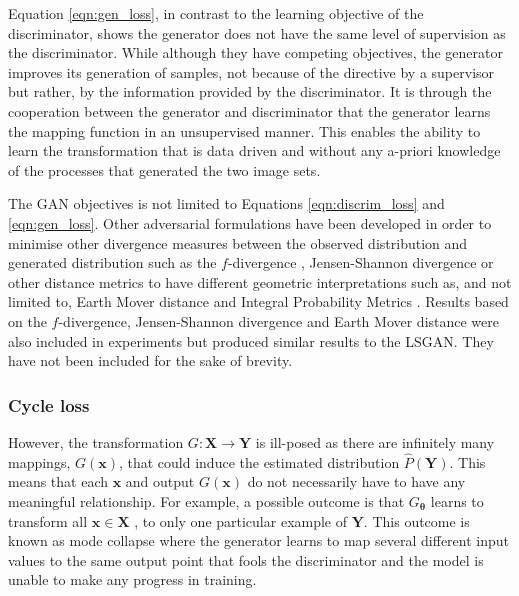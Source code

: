 Equation \ref{eqn:gen_loss}, in contrast to the learning objective of the discriminator, shows the generator does not have the same level of supervision as the discriminator. While although they have competing objectives, the generator improves its generation of samples, not because of the directive by a supervisor but rather, by the information provided by the discriminator. It is through the cooperation between the generator and discriminator that the generator learns the mapping function in an unsupervised manner. This enables the ability to learn the transformation that is data driven and without any a-priori knowledge of the processes that generated the two image sets.

The GAN objectives is not limited to Equations \ref{eqn:discrim_loss} and \ref{eqn:gen_loss}. Other adversarial formulations have been developed in order to minimise other divergence measures between the observed distribution and generated distribution such as the $f$-divergence \citep{nowozin2016f}, Jensen-Shannon divergence \citep{goodfellow2016nips} or other distance metrics to have different geometric interpretations such as, and not limited to, Earth Mover distance \citep{arjovsky2017wasserstein} and Integral Probability Metrics \citep{mroueh2017mcgan}.
Results based on the $f$-divergence, Jensen-Shannon divergence and Earth Mover distance were also included in experiments but produced similar results to the LSGAN. They have not been included for the sake of brevity.

\subsubsection{Cycle loss}
However, the transformation $G:\mathbf{X}\rightarrow \mathbf{Y}$ is ill-posed as there are infinitely many mappings, $G(\mathbf{x})$, that could induce the estimated distribution $\hat{P}({\mathbf{Y}})$. This means that each $\mathbf{x}$ and output $G(\mathbf{x})$ do not necessarily have to have any meaningful relationship.  For example, a possible outcome is that $G_\mathbf{\theta}$ learns to transform all $\mathbf{x} \in \mathbf{X}$ , to only one particular example of $\mathbf{Y}$. This outcome is known as mode collapse where the generator learns to map several different input values to the same output point that fools the discriminator and the model is unable to make any progress in training.

